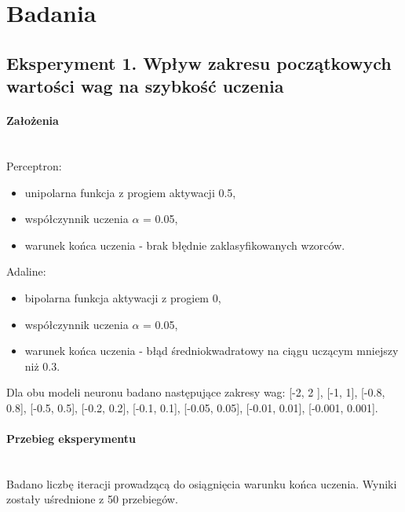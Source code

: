 \documentclass{article}
\begin{document}
	\section{Badania}

	\subsection*{Eksperyment 1. Wpływ zakresu początkowych wartości wag na szybkość uczenia} \label{sec:experiment1}
	\paragraph{Założenia}\mbox{}\\
	Perceptron:
	\begin{itemize}
		\item unipolarna funkcja z progiem aktywacji 0.5,
		\item współczynnik uczenia $\alpha$ = 0.05,
		\item warunek końca uczenia - brak błędnie zaklasyfikowanych wzorców.
	\end{itemize}

	Adaline:
	\begin{itemize}
		\item bipolarna funkcja aktywacji z progiem 0,
		\item współczynnik uczenia $\alpha$ = 0.05,
		\item warunek końca uczenia - błąd średniokwadratowy na ciągu uczącym mniejszy niż 0.3.
	\end{itemize}
	Dla obu modeli neuronu badano następujące zakresy wag: [-2, 2 ],
	[-1, 1], [-0.8, 0.8], [-0.5, 0.5], [-0.2, 0.2], [-0.1, 0.1], [-0.05, 0.05], [-0.01, 0.01], [-0.001, 0.001].
	\paragraph{Przebieg eksperymentu }\mbox{}\\
	Badano liczbę iteracji prowadzącą do osiągnięcia warunku końca uczenia. Wyniki zostały uśrednione z 50 przebiegów.
\end{document}
